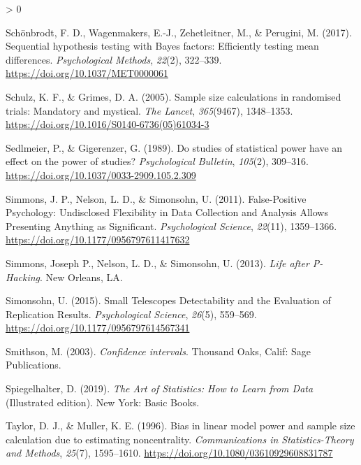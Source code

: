 \documentclass[
  english,
  ,jou, a4paper,floatsintext]{apa6}
\newlength{\cslhangindent}
\newenvironment{CSLReferences}[2] %
 {%
  \setlength{\parindent}{0pt}
  \ifodd #1 \everypar{\setlength{\hangindent}{\cslhangindent}}\ignorespaces\fi
  \ifnum #2 > 0
  \setlength{\parskip}{#2\baselineskip}
  \fi
 }%
 {}
\begin{document}
\begin{CSLReferences}{1}{0}
\leavevmode\hypertarget{ref-schonbrodt_sequential_2017}{}%
Schönbrodt, F. D., Wagenmakers, E.-J., Zehetleitner, M., \& Perugini, M. (2017). Sequential hypothesis testing with {Bayes} factors: Efficiently testing mean differences. \emph{Psychological Methods}, \emph{22}(2), 322--339. \url{https://doi.org/10.1037/MET0000061}

\leavevmode\hypertarget{ref-schulz_sample_2005}{}%
Schulz, K. F., \& Grimes, D. A. (2005). Sample size calculations in randomised trials: Mandatory and mystical. \emph{The Lancet}, \emph{365}(9467), 1348--1353. \url{https://doi.org/10.1016/S0140-6736(05)61034-3}

\leavevmode\hypertarget{ref-sedlmeier_studies_1989}{}%
Sedlmeier, P., \& Gigerenzer, G. (1989). Do studies of statistical power have an effect on the power of studies? \emph{Psychological Bulletin}, \emph{105}(2), 309--316. \url{https://doi.org/10.1037/0033-2909.105.2.309}

\leavevmode\hypertarget{ref-simmons_false-positive_2011}{}%
Simmons, J. P., Nelson, L. D., \& Simonsohn, U. (2011). False-{Positive Psychology}: Undisclosed {Flexibility} in {Data Collection} and {Analysis Allows Presenting Anything} as {Significant}. \emph{Psychological Science}, \emph{22}(11), 1359--1366. \url{https://doi.org/10.1177/0956797611417632}

\leavevmode\hypertarget{ref-simmons_life_2013}{}%
Simmons, Joseph P., Nelson, L. D., \& Simonsohn, U. (2013). \emph{Life after {P}-{Hacking}}. {New Orleans, LA}.

\leavevmode\hypertarget{ref-simonsohn_small_2015}{}%
Simonsohn, U. (2015). Small {Telescopes Detectability} and the {Evaluation} of {Replication Results}. \emph{Psychological Science}, \emph{26}(5), 559--569. \url{https://doi.org/10.1177/0956797614567341}

\leavevmode\hypertarget{ref-smithson_confidence_2003}{}%
Smithson, M. (2003). \emph{Confidence intervals}. {Thousand Oaks, Calif}: {Sage Publications}.

\leavevmode\hypertarget{ref-spiegelhalter_art_2019}{}%
Spiegelhalter, D. (2019). \emph{The {Art} of {Statistics}: How to {Learn} from {Data}} (Illustrated edition). {New York}: {Basic Books}.

\leavevmode\hypertarget{ref-taylor_bias_1996}{}%
Taylor, D. J., \& Muller, K. E. (1996). Bias in linear model power and sample size calculation due to estimating noncentrality. \emph{Communications in Statistics-Theory and Methods}, \emph{25}(7), 1595--1610. \url{https://doi.org/10.1080/03610929608831787}


\end{CSLReferences}
\end{document}
